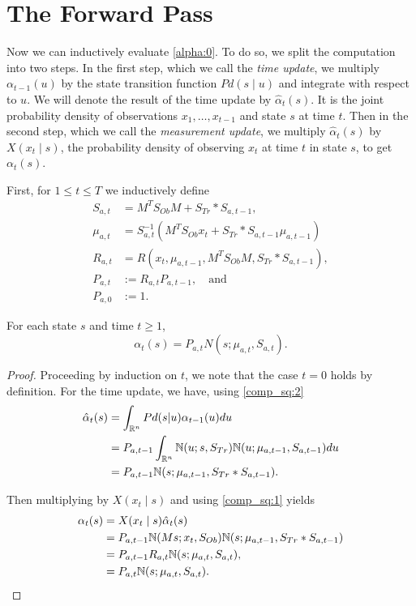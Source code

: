 \documentclass[12pt,leqno]{article}
\begin{document}
\section{The Forward Pass}
  Now we can inductively evaluate \eqref{alpha:0}. To do so, we split the computation
  into two steps.  In the first step, which we call the {\em time update}, we multiply
  $\alpha_{t-1}(u)$ by the state transition function $Pd(s\mid u)$ and integrate with respect
  to $u$. We will denote the result of the time update by $\hat{\alpha}_t(s)$.  It is the joint probability
  density of observations $x_1,\dots,x_{t-1}$ and state $s$ at time $t$.
  Then in the second step, which we call the {\em measurement update}, we multiply
  $\hat{\alpha}_t(s)$ by $X(x_t \mid s)$, the probability density of observing $x_t$ at time $t$
  in state $s$, to get $\alpha_t(s)$.

  First, for $1\le t \le T$ we inductively define
\begin{align*}
  S_{a,t} &= M^TS_{Ob}M + S_{Tr}*S_{a,t-1},\\
  \mu_{a,t} &= S_{a,t}^{-1}(M^TS_{Ob}x_t + S_{Tr}*S_{a,t-1}\mu_{a,t-1})\\
  R_{a,t} &= R(x_t,\mu_{a,t-1},M^TS_{Ob}M,S_{Tr}*S_{a,t-1}),\\
  P_{a,t} &:= R_{a,t}P_{a,t-1},\quad\text{and}\\
  P_{a,0} &:= 1.
\end{align*}

\begin{Thm}\label{alpha:1}
  For each state $s$ and time $t \ge 1$,
$$
  \alpha_t(s) = P_{a,t}N(s;\mu_{a,t},S_{a,t}).
$$
\end{Thm}

\begin{proof}

Proceeding by induction on $t$, we note that the case $t = 0$ holds by definition.
For the time update, we have, using \eqref{comp_sq:2}
\begin{align}
  \hat{\alpha}_t(s) &= \int_{{\mathbb R}^n}Pd(s|u)\alpha_{t-1}(u)du \\\notag
 &= P_{a,t-1}\int_{{\mathbb R}^n}{\mathbb N}(u;s,S_{Tr}){\mathbb N}(u;\mu_{a,t-1},S_{a,t-1})du \notag\\
 &= P_{a,t-1}{\mathbb N}(s;\mu_{a,t-1},S_{Tr}*S_{a,t-1}).
\end{align}

Then multiplying by $X(x_t\mid s)$ and using \eqref{comp_sq:1} yields
\begin{align*}
  \alpha_t(s) &= X(x_t\mid s)\hat{\alpha}_t(s) \\
  &= P_{a,t-1}{\mathbb N}(Ms;x_t,S_{Ob}){\mathbb N}(s;\mu_{a,t-1},S_{Tr}*S_{a,t-1}) \\
  &= P_{a,t-1}R_{a,t}{\mathbb N}(s;\mu_{a,t},S_{a,t}), \\
  &= P_{a,t}{\mathbb N}(s;\mu_{a,t},S_{a,t}).
\end{align*}
\end{proof}
\end{document}
